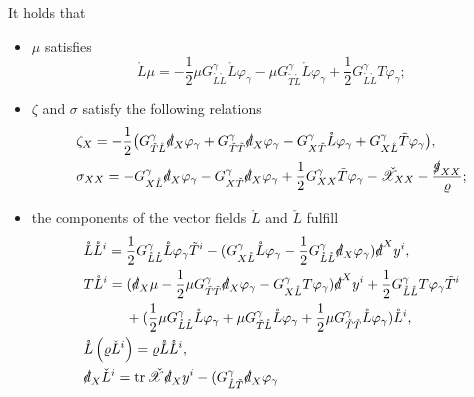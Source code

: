 \documentclass[11pt,twoside]{article}
\def\vp{\varphi}
\begin{document}
\begin{lemma}\label{Lem3.3}
It holds that
\begin{itemize}[leftmargin=*, labelsep=6pt, itemsep=10pt]
\item $\mu$ satisfies
\begin{equation}\label{lmu}
\mathring{L}\mu = -\frac{1}{2}\mu G_{\mathring{L}\mathring{L}}^\gamma \mathring{L}\vp_\gamma
- \mu G_{\tilde{T}\mathring{L}}^\gamma \mathring{L}\vp_\gamma + \frac{1}{2}G_{\mathring{L}\mathring{L}}^\gamma T\vp_\gamma;
\end{equation}
\item $\zeta$ and $\sigma$ satisfy the following relations
\begin{align}
&\zeta_X = -\frac{1}{2}\big(G_{\tilde{T}\mathring{L}}^\gamma \slashed{d}_X\vp_\gamma + G_{\tilde{T}\tilde{T}}^\gamma \slashed{d}_X\vp_\gamma
- G_{X\tilde{T}}^\gamma \mathring{L}\vp_\gamma + G_{X\mathring{L}}^\gamma \tilde{T}\vp_\gamma \big),\label{zeta}\\
&\sigma_{XX} = -G_{X\mathring{L}}^\gamma \slashed{d}_X\vp_\gamma - G_{X\tilde{T}}^\gamma \slashed{d}_X\vp_\gamma
+ \frac{1}{2}G_{XX}^\gamma \tilde{T}\vp_\gamma - \check{\mathscr{X}}_{XX} - \frac{\slashed{g}_{XX}}{\varrho};\label{theta}
\end{align}
\item the components of the vector fields $\mathring{L}$ and $\check{L}$ fulfill
\begin{align}
&\mathring{L}\mathring{L}^i = \frac{1}{2}G_{\mathring{L}\mathring{L}}^\gamma \mathring{L}\vp_\gamma \tilde{T}^i
-(G_{X\mathring{L}}^\gamma \mathring{L}\vp_\gamma - \frac{1}{2}G_{\mathring{L}\mathring{L}}^\gamma \slashed{d}_X\vp_\gamma )\slashed{d}^X y^i,\label{LL}\\
&T\mathring{L}^i = (\slashed{d}_X\mu - \frac{1}{2}\mu G_{\tilde{T}\tilde{T}}^\gamma \slashed{d}_X\vp_\gamma
- G_{X\mathring{L}}^\gamma T\vp_\gamma)\slashed{d}^X y^i + \frac{1}{2}G_{\mathring{L}\mathring{L}}^\gamma T\vp_\gamma \tilde{T}^i \nonumber\\
&\qquad\quad +(\frac{1}{2}\mu G_{\mathring{L}\mathring{L}}^\gamma \mathring{L}\vp_\gamma + \mu G_{\tilde{T}\mathring{L}}^\gamma \mathring{L}\vp_\gamma
+ \frac{1}{2}\mu G_{\tilde{T}\tilde{T}}^\gamma \mathring{L}\vp_\gamma)\mathring{L}^i,\label{TL}\\
&\mathring{L}\left( \varrho\check{L}^i \right) = \varrho\mathring{L}\mathring{L}^i,\label{LeL}\\
&\slashed{d}_X\check{L}^i = \operatorname{tr}\check{\mathscr{X}} \slashed{d}_X y^i-(G_{\mathring{L}\tilde{T}}^\gamma \slashed{d}_X\vp_\gamma

\end{align}
\end{itemize}
\end{lemma}
\end{document}
